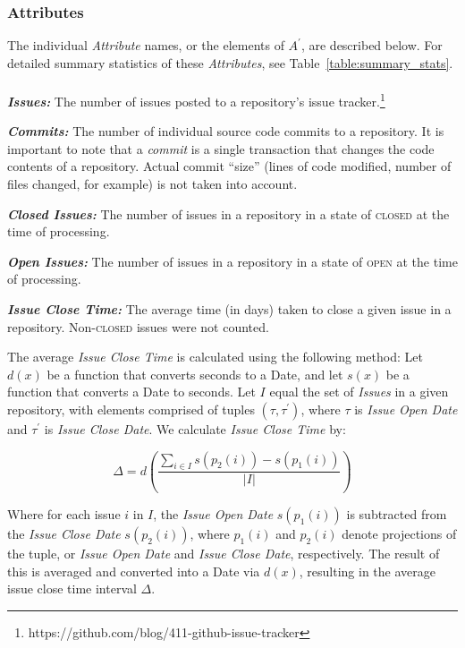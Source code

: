 \documentclass{proc}
\begin{document}
{{{{{{{\subsubsection{Attributes}
\label{sec:attributes}
The individual \textit{Attribute} names, or the elements of $A^\prime$, are described below. For detailed summary statistics of these \textit{Attributes}, see Table~\ref{table:summary_stats}.\\\\
\noindent \textbf{\textit{Issues:}}
The number of issues posted to a repository's issue tracker.\footnote{https://github.com/blog/411-github-issue-tracker}

\noindent \textbf{\textit{Commits:}}
The number of individual source code commits to a repository. It is important to note that a \textit{commit} is a single transaction that changes the code contents of a repository. Actual commit ``size'' (lines of code modified, number of files changed, for example) is not taken into account.

\noindent \textbf{\textit{Closed Issues:}}
The number of issues in a repository in a state of \textsc{closed} at the time of processing.

\noindent \textbf{\textit{Open Issues:}}
The number of issues in a repository in a state of \textsc{open} at the time of processing.

\noindent \textbf{\textit{Issue Close Time:}}
The average time (in days) taken to close a given issue in a repository. Non-\textsc{closed} issues were not counted.

The average \textit{Issue Close Time} is calculated using the following method: Let $d(x)$ be a function that converts seconds to a Date, and let $s(x)$ be a function that converts a Date to seconds. Let $I$ equal the set of \textit{Issues} in a given repository, with elements comprised of tuples $(\tau, \tau^\prime)$, where $\tau$ is \textit{Issue Open Date} and $\tau^\prime$ is \textit{Issue Close Date}. We calculate \textit{Issue Close Time} by: 

\[ \Delta = d\left( \frac{\sum_{i \in I} s\left(p_{2}(i) \right) - s\left(p_{1}(i) \right)  } {|I|} \right) \]

Where for each issue $i$ in $I$, the \textit{Issue Open Date} $s( p_{1}(i))$ is subtracted from the \textit{Issue Close Date} $s( p_{2}(i))$, where $p_{1}(i)$ and $p_{2}(i)$ denote projections of the tuple, or \textit{Issue Open Date} and \textit{Issue Close Date}, respectively. The result of this is averaged and converted into a Date via $d(x)$, resulting in the average issue close time interval $\Delta$.

}}}}}}}
\end{document}

